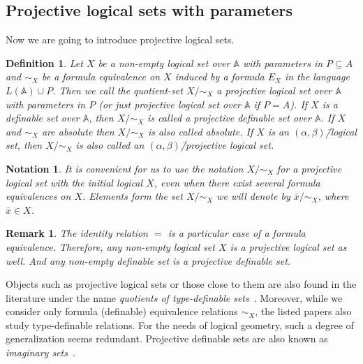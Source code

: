 \documentclass[12pt]{article}
\newtheorem{remark}{Remark}
\newtheorem{notation}{Notation}
\newtheorem{definition}{Definition}
\theoremstyle{definition}
\def\MA{{\mathbb{A}}}
\begin{document}
\subsection{Projective logical sets with parameters}\label{subsec:proj_sets}

Now we are going to introduce projective logical sets.

\begin{definition}\label{def2}
Let $X$ be a non-empty logical set over $\MA$ with parameters in $P\subseteq A$ and $\sim_X$ be a formula equivalence on $X$ induced by a formula $E_X$ in the language $L(\MA)\cup P$. Then we call the quotient-set $X/{\sim_X}$ a {\em projective logical set over $\MA$ with parameters in $P$} (or just {\em projective logical set over $\MA$} if $P=A$). If $X$ is a definable set over $\MA$, then $X/{\sim_X}$ is called {\em a projective definable set} over $\MA$. If $X$ and $\sim_X$ are absolute then $X/{\sim_X}$ is also called {\em absolute}. If $X$ is an $(\alpha,\beta)$\=/logical set, then $X/{\sim_X}$ is also called an {\em $(\alpha,\beta)$\=/projective logical set}.
\end{definition}

\begin{notation}
 It is convenient for us to use the notation $X/{\sim_X}$ for a projective logical set with the initial logical $X$, even when there exist several formula equivalences on $X$. Elements form the set $X/{\sim_X}$ we will denote by $\bar x/{\sim_X}$, where $\bar x\in X$.
\end{notation}

\begin{remark}
The identity relation $=$ is a particular case of a formula equivalence. Therefore, any non-empty logical set $X$ is a projective logical set as well. And any non-empty definable set is a projective definable set.
\end{remark}

Objects such as projective logical sets or those close to them are also found in the literature under the name {\em quotients of type-definable sets}~\cite{Dries, ElPet, HaskelPillay, Rzepecki}. Moreover, while we consider only formula (definable) equivalence relations $\sim_X$, the listed papers also study type-definable relations. For the needs of logical geometry, such a degree of generalization seems redundant. Projective definable sets are also known as {\em imaginary sets}~\cite{AvniMeiri}.
\end{document}
